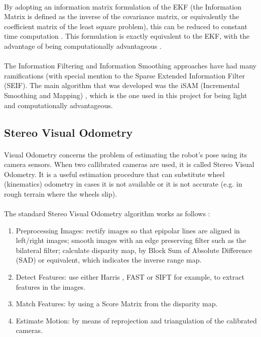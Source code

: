 \documentclass[11pt]{article}
\begin{document}
	\paragraph{}
	By adopting an information matrix formulation of the EKF (the Information Matrix is defined as the inverse of the covariance matrix, or equivalently the coefficient matrix of the least square problem), this can be reduced to constant time computation \cite{doi:10.1117/12.381658}. This formulation is exactly equivalent to the EKF, with the advantage of being computationally advantageous \cite{Dellaert-2006-9639}.
	
	\paragraph{}
	The Information Filtering and Information Smoothing approaches have had many ramifications (with special mention to the Sparse Extended Information Filter (SEIF)\cite{doi:10.1117/12.381658}. The main algorithm that was developed was the iSAM (Incremental Smoothing and Mapping) \cite{Kaess08tro}, which is the one used in this project for being light and computationally advantageous.	
	
	\subsection{Stereo Visual Odometry}
	\paragraph{}
	Visual Odometry concerns the problem of estimating the robot's pose using its camera sensors. When two callibrated cameras are used, it is called Stereo Visual Odometry. It is a useful estimation procedure that can substitute wheel (kinematics) odometry in cases it is not available or it is not accurate (e.g. in rough terrain where the wheels slip).
	
	\paragraph{}
	The standard Stereo Visual Odometry algorithm works as follows \cite{StereoVis1}:
	\begin{enumerate}[leftmargin=.8in]
	\item Preprocessing Images: rectify images so that epipolar lines are aligned in left/right images; smooth images with an edge preserving filter such as the bilateral filter; calculate disparity map, by Block Sum of Absolute Difference (SAD) or equivalent, which indicates the inverse range map.
	\item Detect Features: use either Harris \cite{Harris}, FAST \cite{FAST} or  SIFT \cite{SIFT} for example, to extract features in the images.
	\item Match Features: by using a Score Matrix from the disparity map.
	\item Estimate Motion: by means of reprojection and triangulation of the calibrated cameras.
	\end{enumerate}
	
\end{document}
